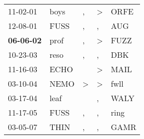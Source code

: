 \begin{supertabular}{p{0.07\textwidth}p{0.06\textwidth}p{0.02\textwidth}p{0.02\textwidth}p{0.06\textwidth}}
          11-02-01\textsuperscript{} &  boys\textsuperscript{} &             , &  \textgreater &  ORFE\textsuperscript{} \\
          12-08-01\textsuperscript{} &  FUSS\textsuperscript{} &             , &             , &   AUG\textsuperscript{} \\
 \textbf{06-06-02\textsuperscript{}} &  prof\textsuperscript{} &             , &  \textgreater &  FUZZ\textsuperscript{} \\
          10-23-03\textsuperscript{} &  reso\textsuperscript{} &             , &             , &   DBK\textsuperscript{} \\
          11-16-03\textsuperscript{} &  ECHO\textsuperscript{} &               &  \textgreater &  MAIL\textsuperscript{} \\
          03-10-04\textsuperscript{} &  NEMO\textsuperscript{} &  \textgreater &  \textgreater &  fwll\textsuperscript{} \\
          03-17-04\textsuperscript{} &  leaf\textsuperscript{} &               &             , &  WALY\textsuperscript{} \\
          11-17-05\textsuperscript{} &  FUSS\textsuperscript{} &             , &             , &  ring\textsuperscript{} \\
          03-05-07\textsuperscript{} &  THIN\textsuperscript{} &             , &             , &  GAMR\textsuperscript{} \\
\end{supertabular}
